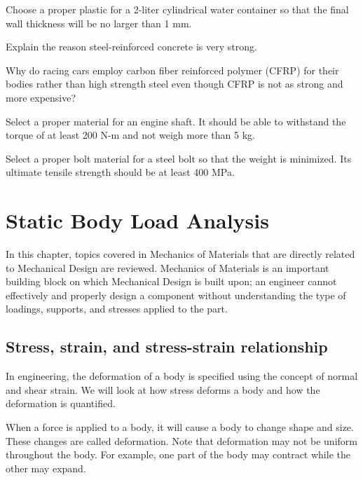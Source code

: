 \documentclass[
10pt,
a4paper,
openany,
svgnames,
]{book}
\newcommand{\exercise}{%
\item \label{lab:\arabic{chapter}.\arabic{exercisesi}}  %
}
\begin{document}
\begin{exercises}

  \exercise Choose a proper plastic for a 2-liter cylindrical water container so that the final wall thickness will be no larger than 1 mm.

  \exercise Explain the reason steel-reinforced concrete is very strong.

  \exercise Why do racing cars employ carbon fiber reinforced polymer (CFRP) for their bodies rather than high strength steel even though CFRP is not as strong and more expensive?

  \exercise Select a proper material for an engine shaft. It should be able to withstand the torque of at least 200 N-m and not weigh more than 5 kg.

  \exercise Select a proper bolt material for a steel bolt so that the weight is minimized. Its ultimate tensile strength should be at least 400 MPa.

\end{exercises}


 
\chapter{Static Body Load Analysis}

In this chapter, topics covered in Mechanics of Materials that are directly related to Mechanical Design are reviewed. Mechanics of Materials is an important building block on which Mechanical Design is built upon; an engineer cannot effectively and properly design a component without understanding the type of loadings, supports, and stresses applied to the part.

\section{Stress, strain, and stress-strain relationship}

In engineering, the deformation of a body is specified using the concept of normal and shear strain. We will look at how stress deforms a body and how the deformation is quantified.

When a force is applied to a body, it will cause a body to change shape and size. These changes are called deformation. Note that deformation may not be uniform throughout the body. For example, one part of the body may contract while the other may expand.
\end{document}
